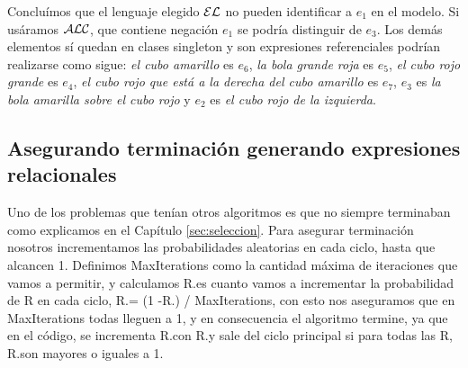 Conclu\'imos que el lenguaje elegido $\mathcal{EL}$ no pueden identificar a $e_1$ en el modelo. Si us\'aramos $\mathcal{ALC}$, que contiene negaci\'on $e_1$ se podr\'ia distinguir de $e_3$. Los dem\'as elementos s\'i quedan en clases singleton y son expresiones referenciales podr\'ian realizarse como sigue:
{\it el cubo amarillo} es $e_6$, {\it la bola grande roja} es $e_5$, {\it el cubo rojo grande} es $e_4$, {\it el cubo rojo que est\'a a la derecha del cubo amarillo} es $e_7$, $e_3$ es {\it la bola amarilla sobre el cubo rojo} y $e_2$ es {\it el cubo rojo de la izquierda}.
 






\subsection{Asegurando terminaci\'on generando expresiones relacionales}

Uno de los problemas que ten\'ian otros algoritmos es que no siempre terminaban como explicamos en el Cap\'itulo \ref{sec:seleccion}. Para asegurar terminaci\'on nosotros incrementamos las probabilidades aleatorias en cada ciclo, hasta que alcancen 1. Definimos MaxIterations como la cantidad m\'axima de iteraciones que vamos a permitir, y calculamos R.\incuse es cuanto vamos a incrementar la probabilidad de R en cada ciclo, R.\incuse = (1 -R.\puse) / MaxIterations, con esto nos aseguramos que en MaxIterations todas lleguen a 1, y en consecuencia el algoritmo termine, ya que en el c\'odigo, se incrementa R.\puse con R.\incuse y sale del ciclo principal si para todas las R, R.\puse son mayores o iguales a 1.


